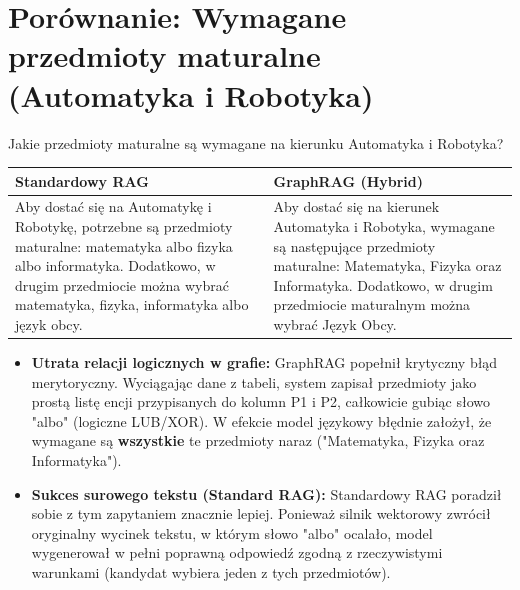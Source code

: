 \newpage

\section*{Porównanie: Wymagane przedmioty maturalne (Automatyka i Robotyka)}

\begin{tcolorbox}[colback=blue!5!white,colframe=blue!75!black,title=Pytanie użytkownika]
    Jakie przedmioty maturalne są wymagane na kierunku Automatyka i Robotyka?
\end{tcolorbox}

\noindent
\begin{tabularx}{\textwidth}{@{} XX @{}}
    \toprule
    \textbf{Standardowy RAG} & \textbf{GraphRAG (Hybrid)} \\
    \midrule
    \small 
    Aby dostać się na Automatykę i Robotykę, potrzebne są przedmioty maturalne: matematyka albo fizyka albo informatyka. Dodatkowo, w drugim przedmiocie można wybrać matematyka, fizyka, informatyka albo język obcy.
    & 
    \small 
    Aby dostać się na kierunek Automatyka i Robotyka, wymagane są następujące przedmioty maturalne: Matematyka, Fizyka oraz Informatyka. Dodatkowo, w drugim przedmiocie maturalnym można wybrać Język Obcy. \\
    \bottomrule
\end{tabularx}

\begin{tcolorbox}[colback=red!5!white,colframe=red!50!black,title=Wnioski i obserwacje]
    \begin{itemize}
        \item \textbf{Utrata relacji logicznych w grafie:} GraphRAG popełnił krytyczny błąd merytoryczny. Wyciągając dane z tabeli, system zapisał przedmioty jako prostą listę encji przypisanych do kolumn P1 i P2, całkowicie gubiąc słowo "albo" (logiczne LUB/XOR). W efekcie model językowy błędnie założył, że wymagane są \textbf{wszystkie} te przedmioty naraz ("Matematyka, Fizyka oraz Informatyka").
        \item \textbf{Sukces surowego tekstu (Standard RAG):} Standardowy RAG poradził sobie z tym zapytaniem znacznie lepiej. Ponieważ silnik wektorowy zwrócił oryginalny wycinek tekstu, w którym słowo "albo" ocalało, model wygenerował w pełni poprawną odpowiedź zgodną z rzeczywistymi warunkami (kandydat wybiera jeden z tych przedmiotów).
    \end{itemize}
\end{tcolorbox}
\vspace{1em}

